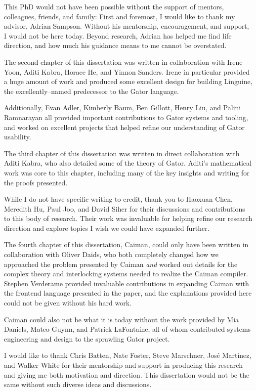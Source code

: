 \documentclass[phd,tocprelim]{cornell}
\begin{document}
\begin{acknowledgements}
This PhD would not have been possible without the support of mentors, colleagues, friends, and family:
First and foremost, I would like to thank my advisor, Adrian Sampson.  Without his mentorship, encouragement, and support, I would not be here today.  Beyond research, Adrian has helped me find life direction, and how much his guidance means to me cannot be overstated.

The second chapter of this dissertation was written in collaboration with Irene Yoon, Aditi Kabra, Horace He, and Yinnon Sanders.  Irene in particular provided a huge amount of work and produced some excellent design for building Linguine, the excellently--named predecessor to the Gator language.  

Additionally, Evan Adler, Kimberly Baum, Ben Gillott, Henry Liu, and Palini Ramnarayan all provided important contributions to Gator systems and tooling, and worked on excellent projects that helped refine our understanding of Gator usability.

The third chapter of this dissertation was written in direct collaboration with Aditi Kabra, who also detailed some of the theory of Gator.  Aditi's mathematical work was core to this chapter, including many of the key insights and writing for the proofs presented.

While I do not have specific writing to credit, thank you to Haoxuan Chen, Meredith Hu, Paul Joo, and David Siher for their discussions and contributions to this body of research.  Their work was invaluable for helping refine our research direction and explore topics I wish we could have expanded further.

The fourth chapter of this dissertation, Caiman, could only have been written in collaboration with Oliver Daids, who both completely changed how we approached the problem presented by Caiman \textit{and} worked out details for the complex theory and interlocking systems needed to realize the Caiman compiler.  Stephen Verderame provided invaluable contributions in expanding Caiman with the frontend language presented in the paper, and the explanations provided here could not be given without his hard work.

Caiman could also not be what it is today without the work provided by Mia Daniels, Mateo Guynn, and Patrick LaFontaine, all of whom contributed systems engineering and design to the sprawling Gator project.

I would like to thank Chris Batten, Nate Foster, Steve Marschner, Jos\'e Mart\'inez, and Walker White for their mentorship and support in producing this research and giving me both motivation and direction.  This dissertation would not be the same without such diverse ideas and discussions.


\end{acknowledgements}
\end{document}
